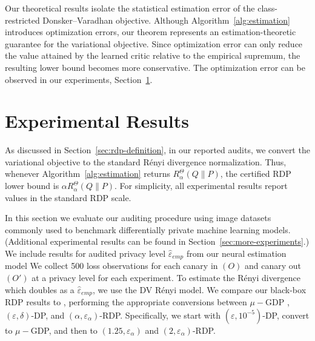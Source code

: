 \documentclass{article}
\theoremstyle{plain}
\theoremstyle{definition}
\theoremstyle{remark}
\begin{document}
Our theoretical results isolate the statistical estimation error of the class-restricted Donsker--Varadhan objective. Although Algorithm~\ref{alg:estimation} introduces optimization errors, our theorem represents an estimation-theoretic guarantee for the variational objective. Since optimization error can only reduce the value attained by the learned critic relative to the empirical supremum, the resulting lower bound becomes more conservative. The optimization error can be observed in our experiments, Section~\ref{sec:experiments}.




\section{Experimental Results}
\label{sec:experiments}



As discussed in Section~\ref{sec:rdp-definition}, in our reported audits, we convert the variational objective to the standard R\'enyi
divergence normalization. Thus, whenever Algorithm~\ref{alg:estimation} returns 
$R^\Theta_\alpha(Q\|P)$, the certified RDP lower bound is $\alpha R^\Theta_\alpha(Q\|P)$.
For simplicity, all experimental results report values in the standard RDP scale.

In this section we evaluate our auditing procedure using image datasets commonly used to benchmark differentially private machine learning models. (Additional
experimental results can be found in Section~\ref{sec:more-experiments}.)
We include results for audited privacy level $\widehat \varepsilon_{emp}$ from our neural estimation model
We collect 500 loss observations for each canary in $(O)$ and canary out $(O')$ at a privacy level for each experiment. To estimate the R\'enyi divergence which doubles as a $\widehat \varepsilon_{emp}$, we use the DV R\'enyi model.
We compare our black-box RDP results to \cite{muthu2024nearly}, performing the appropriate conversions between $\mu-$GDP \cite{dong2019gaussian}, $(\varepsilon, \delta)$-DP, and $(\alpha, \varepsilon_\alpha)$-RDP. Specifically, we start with $(\varepsilon, 10^{-5})$-DP, convert to $\mu-$GDP, and then to $(1.25, \varepsilon_\alpha)$ and $(2, \varepsilon_\alpha)$-RDP.
\end{document}
